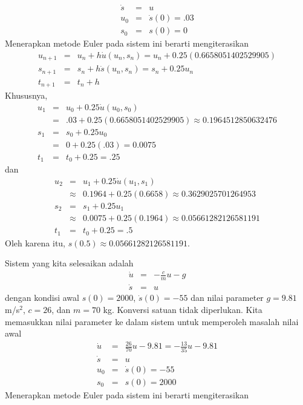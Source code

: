 \begin{description}
\begin{eqnarray*}
\dot{s} & = & u\\
u_{0} & = & \dot{s}(0)=.03\\
s_{0} & = & s(0)=0
\end{eqnarray*}
Menerapkan metode Euler pada sistem ini berarti mengiterasikan
\begin{eqnarray*}
u_{n+1} & = & u_{n}+h\dot{u}(u_{n},s_{n})=u_{n}+0.25(0.6658051402529905)\\
s_{n+1} & = & s_{n}+h\dot{s}(u_{n},s_{n})=s_{n}+0.25u_{n}\\
t_{n+1} & = & t_{n}+h
\end{eqnarray*}
Khususnya,
\begin{eqnarray*}
u_{1} & = & u_{0}+0.25\dot{u}(u_{0},s_{0})\\
 & = & .03+0.25(0.6658051402529905)\approx0.1964512850632476\\
s_{1} & = & s_{0}+0.25u_{0}\\
 & = & 0+0.25(.03)=0.0075\\
t_{1} & = & t_{0}+0.25=.25
\end{eqnarray*}
dan
\begin{eqnarray*}
u_{2} & = & u_{1}+0.25\dot{u}(u_{1},s_{1})\\
 & \approx & 0.1964+0.25(0.6658)\approx0.3629025701264953\\
s_{2} & = & s_{1}+0.25u_{1}\\
 & \approx & 0.0075+0.25(0.1964)\approx0.05661282126581191\\
t_{1} & = & t_{0}+0.25=.5
\end{eqnarray*}
Oleh karena itu, $s(0.5)\approx0.05661282126581191$.
\item [{\ref{exc:ode-taylor-21}m:}] Sistem yang kita selesaikan adalah
\begin{eqnarray*}
\dot{u} & = & -\frac{c}{m}u-g\\
\dot{s} & = & u
\end{eqnarray*}
dengan kondisi awal $s(0)=2000$, $\dot{s}(0)=-55$ dan nilai parameter
$g=9.81$ m/s$^{2}$, $c=26$, dan $m=70$ kg. Konversi satuan tidak
diperlukan. Kita memasukkan nilai parameter ke dalam sistem untuk
memperoleh masalah nilai awal
\begin{eqnarray*}
\dot{u} & = & \frac{26}{70}u-9.81=-\frac{13}{35}u-9.81\\
\dot{s} & = & u\\
u_{0} & = & \dot{s}(0)=-55\\
s_{0} & = & s(0)=2000
\end{eqnarray*}
Menerapkan metode Euler pada sistem ini berarti mengiterasikan

\end{description}
